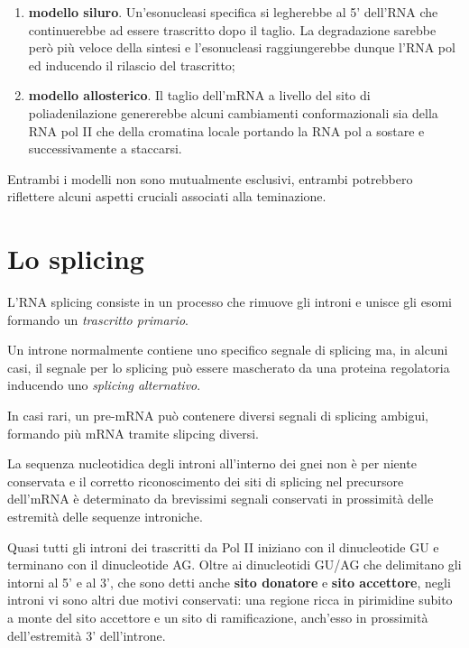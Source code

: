 \documentclass[11pt]{book}
\begin{document}
\begin{enumerate}
\def\labelenumi{\arabic{enumi}.}
\itemsep1pt\parskip0pt
\item
  \textbf{modello siluro}. Un'esonucleasi specifica si legherebbe al 5'
  dell'RNA che continuerebbe ad essere trascritto dopo il taglio. La
  degradazione sarebbe però più veloce della sintesi e l'esonucleasi
  raggiungerebbe dunque l'RNA pol ed inducendo il rilascio del
  trascritto;
\item
  \textbf{modello allosterico}. Il taglio dell'mRNA a livello del sito
  di poliadenilazione genererebbe alcuni cambiamenti conformazionali sia
  della RNA pol II che della cromatina locale portando la RNA pol a
  sostare e successivamente a staccarsi.
\end{enumerate}

Entrambi i modelli non sono mutualmente esclusivi, entrambi potrebbero
riflettere alcuni aspetti cruciali associati alla teminazione.

\section{Lo splicing}\label{lo-splicing}

L'RNA splicing consiste in un processo che rimuove gli introni e unisce
gli esomi formando un \emph{trascritto primario}.

Un introne normalmente contiene uno specifico segnale di splicing ma, in
alcuni casi, il segnale per lo splicing può essere mascherato da una
proteina regolatoria inducendo uno \emph{splicing alternativo}.

In casi rari, un pre-mRNA può contenere diversi segnali di splicing
ambigui, formando più mRNA tramite slipcing diversi.

La sequenza nucleotidica degli introni all'interno dei gnei non è per
niente conservata e il corretto riconoscimento dei siti di splicing nel
precursore dell'mRNA è determinato da brevissimi segnali conservati in
prossimità delle estremità delle sequenze introniche.

Quasi tutti gli introni dei trascritti da Pol II iniziano con il
dinucleotide GU e terminano con il dinucleotide AG. Oltre ai
dinucleotidi GU/AG che delimitano gli intorni al 5' e al 3', che sono
detti anche \textbf{sito donatore} e \textbf{sito accettore}, negli
introni vi sono altri due motivi conservati: una regione ricca in
pirimidine subito a monte del sito accettore e un sito di ramificazione,
anch'esso in prossimità dell'estremità 3' dell'introne.
\end{document}

